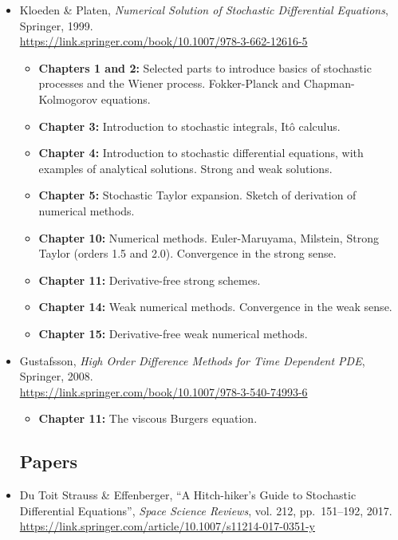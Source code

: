 \documentclass{article}
\begin{document}
\begin{itemize}
    \item Kloeden \& Platen, \emph{Numerical Solution of Stochastic Differential Equations}, Springer, 1999. \\
\url{https://link.springer.com/book/10.1007/978-3-662-12616-5}
    \begin{itemize}
        \item {\bf Chapters 1 and 2:} Selected parts to introduce basics of stochastic processes and the Wiener process. Fokker-Planck and Chapman-Kolmogorov equations.
        \item {\bf Chapter 3:} Introduction to stochastic integrals, Itô calculus.
        \item {\bf Chapter 4:} Introduction to stochastic differential equations, with examples of analytical solutions. Strong and weak solutions.
        \item {\bf Chapter 5:} Stochastic Taylor expansion. Sketch of derivation of numerical methods.
        \item {\bf Chapter 10:} Numerical methods. Euler-Maruyama, Milstein, Strong Taylor (orders 1.5 and 2.0). Convergence in the strong sense.
        \item {\bf Chapter 11:} Derivative-free strong schemes.
        \item {\bf Chapter 14:} Weak numerical methods. Convergence in the weak sense.
        \item {\bf Chapter 15:} Derivative-free weak numerical methods.
    \end{itemize}

\item Gustafsson, \emph{High Order Difference Methods for Time Dependent PDE}, Springer, 2008. \\
    \url{https://link.springer.com/book/10.1007/978-3-540-74993-6}
        \begin{itemize}
            \item {\bf Chapter 11:} The viscous Burgers equation.
        \end{itemize}

        \subsection{Papers}

\item Du Toit Strauss \& Effenberger, ``A Hitch-hiker's Guide to Stochastic Differential Equations'', \emph{Space Science Reviews}, vol. 212, pp.~151--192, 2017. \\
    \url{https://link.springer.com/article/10.1007/s11214-017-0351-y}


\end{itemize}
\end{document}
